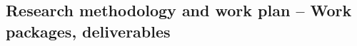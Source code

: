 \documentclass[12pt, a4paper]{article} %
\begin{document}

  
\subsection{Research methodology and work plan – Work packages,
  deliverables}
\end{document}
